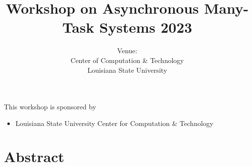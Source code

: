 \documentclass[12pt,letterpaper]{book}
\title{Workshop on Asynchronous Many-Task Systems 2023}
\author{Venue: \\ Center of Computation \& Technology \\ Louisiana State University}
\begin{document}
\frontmatter

\maketitle

This workshop is sponsored by

\begin{itemize}
\item Louisiana State University Center for Computation \& Technology 
\end{itemize}

\newpage

\section*{Abstract}

\end{document}
